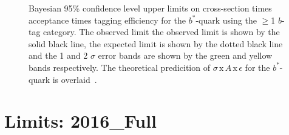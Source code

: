 \begin{figure}[!ht]
   \caption[Bayesian 95\% confidence level upper limits on cross-section times acceptance times tagging efficiency
    for the $b^*$-quark using the $\geq$1 $b$-tag category.
    The observed limit the observed limit is shown by the solid black line,
    the expected limit is shown by the dotted black line
    and the 1 and 2 $\sigma$ error bands are shown by the green and yellow bands respectively.
    The theoretical predicition of $\sigma\,\text{x}\,\mathit{A}\,\text{x}\,\epsilon$
    for the $b^*$-quark is overlaid.]
           {Bayesian 95\% confidence level upper limits on cross-section times acceptance times tagging efficiency
    for the $b^*$-quark using the $\geq$1 $b$-tag category.
    The observed limit the observed limit is shown by the solid black line,
    the expected limit is shown by the dotted black line
    and the 1 and 2 $\sigma$ error bands are shown by the green and yellow bands respectively.
    The theoretical predicition of $\sigma\,\text{x}\,\mathit{A}\,\text{x}\,\epsilon$
    for the $b^*$-quark is overlaid~\cite{dibjet-ichep_conf}.
  }
  \label{fig:lim-summer_bstar}
\end{figure}

\FloatBarrier

\section{Limits: 2016\_Full}
\label{sec:lim-full}
